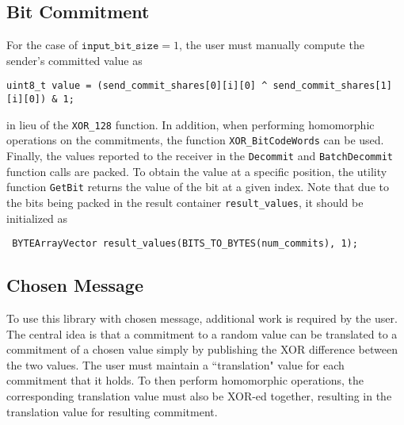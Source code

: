 \subsection{Bit Commitment}

For the case of $\texttt{input\_bit\_size} =1$, the user must manually compute the sender's committed value as 
\begin{lstlisting}     
uint8_t value = (send_commit_shares[0][i][0] ^ send_commit_shares[1][i][0]) & 1;
\end{lstlisting}
in lieu of the \texttt{XOR\_128} function. In addition, when performing homomorphic operations on the commitments, the function \texttt{XOR\_BitCodeWords} can be used. Finally, the values reported to the receiver in the \texttt{Decommit} and \texttt{BatchDecommit} function calls are packed. To obtain the value at a specific position, the utility function \texttt{GetBit} returns the value of the bit at a given index. Note that due to the bits being packed in the result container \texttt{result\_values}, it should be initialized as
\begin{lstlisting}     
 BYTEArrayVector result_values(BITS_TO_BYTES(num_commits), 1);
\end{lstlisting}

\subsection{Chosen Message}

To use this library with chosen message, additional work is required by the user. The central idea is that a commitment to a random value can be translated to a commitment of a chosen value simply by publishing the XOR difference between the two values. The user must maintain a ``translation" value for each commitment that it holds. To then perform homomorphic operations, the corresponding translation value must also be XOR-ed together, resulting in the translation value for resulting commitment.
